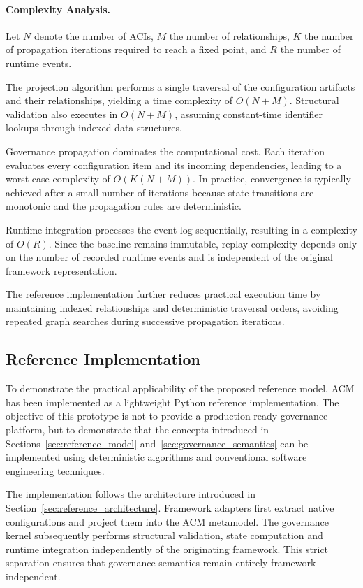 \documentclass[10pt]{article}
\begin{document}
\paragraph{Complexity Analysis.}

Let $N$ denote the number of ACIs, $M$ the number of relationships, $K$ the number of propagation iterations required to reach a fixed point, and $R$ the number of runtime events.

The projection algorithm performs a single traversal of the configuration artifacts and their relationships, yielding a time complexity of $O(N+M)$. Structural validation also executes in $O(N+M)$, assuming constant-time identifier lookups through indexed data structures.

Governance propagation dominates the computational cost. Each iteration evaluates every configuration item and its incoming dependencies, leading to a worst-case complexity of $O(K(N+M))$. In practice, convergence is typically achieved after a small number of iterations because state transitions are monotonic and the propagation rules are deterministic.

Runtime integration processes the event log sequentially, resulting in a complexity of $O(R)$. Since the baseline remains immutable, replay complexity depends only on the number of recorded runtime events and is independent of the original framework representation.

The reference implementation further reduces practical execution time by maintaining indexed relationships and deterministic traversal orders, avoiding repeated graph searches during successive propagation iterations.

\subsection{Reference Implementation}
\label{sec:reference_implementation}

To demonstrate the practical applicability of the proposed reference model, ACM has been implemented as a lightweight Python reference implementation. The objective of this prototype is not to provide a production-ready governance platform, but to demonstrate that the concepts introduced in Sections~\ref{sec:reference_model} and~\ref{sec:governance_semantics} can be implemented using deterministic algorithms and conventional software engineering techniques.

The implementation follows the architecture introduced in Section~\ref{sec:reference_architecture}. Framework adapters first extract native configurations and project them into the ACM metamodel. The governance kernel subsequently performs structural validation, state computation and runtime integration independently of the originating framework. This strict separation ensures that governance semantics remain entirely framework-independent.
\end{document}
